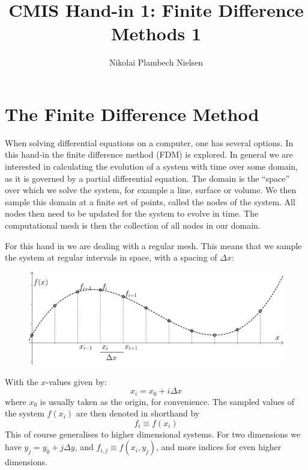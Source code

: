 \documentclass[sigconf]{acmart}
\begin{document}
%
\title{CMIS Hand-in 1: Finite Difference Methods 1}

\author{Nikolai Plambech Nielsen}


\maketitle

\section{The Finite Difference Method}
When solving differential equations on a computer, one has several options. In this hand-in the finite difference method (FDM) is explored.
In general we are interested in calculating the evolution of a system with time over some domain, as it is governed by a partial differential equation. The domain is the ``space'' over which we solve the system, for example a line, surface or volume. We then sample this domain at a finite set of points, called the nodes of the system. All nodes then need to be updated for the system to evolve in time. The computational mesh is then the collection of all nodes in our domain.

For this hand in we are dealing with a regular mesh. This means that we sample the system at regular intervals in space, with a spacing of $ \Delta x $:
\begin{figure}[H]
	\includegraphics[width=\linewidth]{finite_difference1.png}
\end{figure}
With the $ x $-values given by:
\begin{equation}\label{key}
	x_i = x_0 + i \Delta x
\end{equation}
where $ x_0 $ is usually taken as the origin, for convenience. The sampled values of the system $ f(x_i) $ are then denoted in shorthand by
\begin{equation}\label{key}
	f_i \equiv f(x_i)
\end{equation}
This of course generalises to higher dimensional systems. For two dimensions we have $ y_j = y_0 + j \Delta y$, and $ f_{i,j} \equiv f(x_i, y_j) $, and more indices for even higher dimensions.
\end{document}
